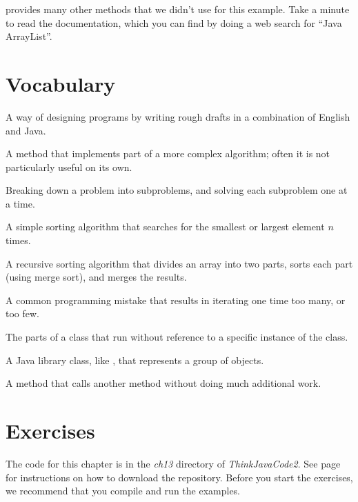  provides many other methods that we didn't use for this example.
Take a minute to read the documentation, which you can find by doing a web search for ``Java ArrayList''.


\section{Vocabulary}

\begin{description}

A way of designing programs by writing rough drafts in a combination of English and Java.

A method that implements part of a more complex algorithm; often it is not particularly useful on its own.

Breaking down a problem into subproblems, and solving each subproblem one at a time.

A simple sorting algorithm that searches for the smallest or largest element $n$ times.

A recursive sorting algorithm that divides an array into two parts, sorts each part (using merge sort), and merges the results.

A common programming mistake that results in iterating one time too many, or too few.

The parts of a class that run without reference to a specific instance of the class.

A Java library class, like , that represents a group of objects.

A method that calls another method without doing much additional work.


\end{description}


\section{Exercises}

The code for this chapter is in the {\it ch13} directory of {\it ThinkJavaCode2}.
See page~\pageref{code} for instructions on how to download the repository.
Before you start the exercises, we recommend that you compile and run the examples.


